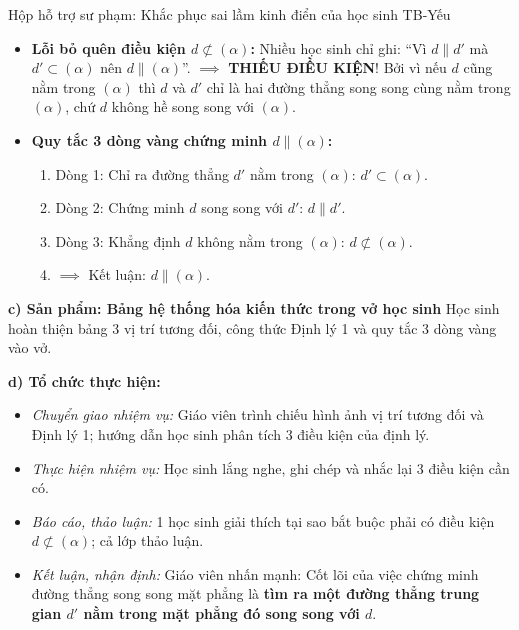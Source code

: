 \documentclass[12pt, a4paper]{article}
\begin{document}
\begin{scaffoldbox}{Hộp hỗ trợ sư phạm: Khắc phục sai lầm kinh điển của học sinh TB-Yếu}
\begin{itemize}[leftmargin=0.6cm]
    \item \textbf{Lỗi bỏ quên điều kiện $d \not\subset (\alpha)$:} Nhiều học sinh chỉ ghi: ``Vì $d \parallel d'$ mà $d' \subset (\alpha)$ nên $d \parallel (\alpha)$''. $\implies$ \textbf{THIẾU ĐIỀU KIỆN}! Bởi vì nếu $d$ cũng nằm trong $(\alpha)$ thì $d$ và $d'$ chỉ là hai đường thẳng song song cùng nằm trong $(\alpha)$, chứ $d$ không hề song song với $(\alpha)$.
    \item \textbf{Quy tắc 3 dòng vàng chứng minh $d \parallel (\alpha)$:}
    \begin{enumerate}
        \item Dòng 1: Chỉ ra đường thẳng $d'$ nằm trong $(\alpha)$: $d' \subset (\alpha)$.
        \item Dòng 2: Chứng minh $d$ song song với $d'$: $d \parallel d'$.
        \item Dòng 3: Khẳng định $d$ không nằm trong $(\alpha)$: $d \not\subset (\alpha)$.
        \item $\implies$ Kết luận: $d \parallel (\alpha)$.
    \end{enumerate}
\end{itemize}
\end{scaffoldbox}

\noindent \textbf{c) Sản phẩm: Bảng hệ thống hóa kiến thức trong vở học sinh}
Học sinh hoàn thiện bảng 3 vị trí tương đối, công thức Định lý 1 và quy tắc 3 dòng vàng vào vở.

\noindent \textbf{d) Tổ chức thực hiện:}
\begin{itemize}[leftmargin=0.8cm]
    \item \textit{Chuyển giao nhiệm vụ:} Giáo viên trình chiếu hình ảnh vị trí tương đối và Định lý 1; hướng dẫn học sinh phân tích 3 điều kiện của định lý.
    \item \textit{Thực hiện nhiệm vụ:} Học sinh lắng nghe, ghi chép và nhắc lại 3 điều kiện cần có.
    \item \textit{Báo cáo, thảo luận:} 1 học sinh giải thích tại sao bắt buộc phải có điều kiện $d \not\subset (\alpha)$; cả lớp thảo luận.
    \item \textit{Kết luận, nhận định:} Giáo viên nhấn mạnh: Cốt lõi của việc chứng minh đường thẳng song song mặt phẳng là \textbf{tìm ra một đường thẳng trung gian $d'$ nằm trong mặt phẳng đó song song với $d$}.
\end{itemize}
\end{document}
